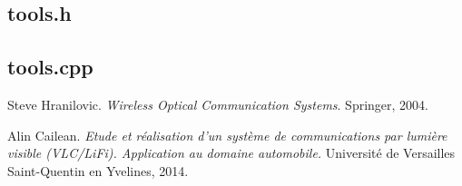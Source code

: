 \documentclass[12pt]{report}
\begin{document}


\subsection{tools.h}



\subsection{tools.cpp}















\begin{thebibliography}{9}

Steve Hranilovic.
\textit{Wireless Optical Communication Systems}.
Springer, 2004.

Alin Cailean.
\textit{Etude et réalisation d’un système de communications par lumière visible (VLC/LiFi). Application au domaine automobile.}
Université de Versailles Saint-Quentin en Yvelines, 2014.

\end{thebibliography}
\end{document}
